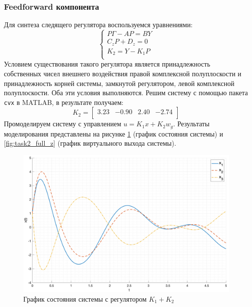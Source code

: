 \FloatBarrier
\subsubsection{Feedforward компонента}
Для синтеза следящего регулятора воспользуемся уравнениями: 
\begin{equation}
    \begin{cases}
        P\Gamma - AP = BY\\ 
        C_z P + D_z = 0 \\ 
        K_2 = Y - K_1 P \\ 
    \end{cases}
\end{equation}
Условием существования такого регулятора является принадлежность собственных чисел 
внешнего воздействия правой комплексной полуплоскости и принадлежность корней 
системы, замкнутой регулятором, левой комплексной полуплоскости. Оба эти условия выполняются. 
Решим систему с помощью пакета \texttt{cvx} в MATLAB, в результате получаем:
\begin{equation}
    K_2 = \begin{bmatrix}
        3.23  & -0.90  & 2.40  & -2.74 \\ 
    \end{bmatrix}
\end{equation}
Промоделируем систему с управлением $u = K_1x + K_2w_g$. Результаты
моделирования представлены на рисунке \ref{fig:task2_full_x} (график состояния системы) и
\ref{fig:task2_full_z} (график виртуального выхода системы).
\begin{figure}[ht!]
    \centering
    \includegraphics[width=\textwidth]{media/plots/task2_full_x.png}
    \caption{График состояния системы с регулятором $K_1 + K_2$}
    \label{fig:task2_full_x}
\end{figure}
